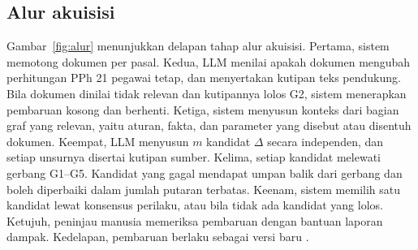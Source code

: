 
\subsection{Alur akuisisi}
\label{subsec:alur}

Gambar~\ref{fig:alur} menunjukkan delapan tahap alur akuisisi. Pertama, sistem memotong dokumen per pasal. Kedua, LLM menilai apakah dokumen mengubah perhitungan PPh 21 pegawai tetap, dan menyertakan kutipan teks pendukung. Bila dokumen dinilai tidak relevan dan kutipannya lolos G2, sistem menerapkan pembaruan kosong dan berhenti. Ketiga, sistem menyusun konteks dari bagian graf yang relevan, yaitu aturan, fakta, dan parameter yang disebut atau disentuh dokumen. Keempat, LLM menyusun $m$ kandidat $\Delta$ secara independen, dan setiap unsurnya disertai kutipan sumber. Kelima, setiap kandidat melewati gerbang G1--G5. Kandidat yang gagal mendapat umpan balik dari gerbang dan boleh diperbaiki dalam jumlah putaran terbatas. Keenam, sistem memilih satu kandidat lewat konsensus perilaku, atau  bila tidak ada kandidat yang lolos. Ketujuh, peninjau manusia memeriksa pembaruan dengan bantuan laporan dampak. Kedelapan, pembaruan berlaku sebagai versi baru .


